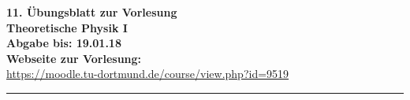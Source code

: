 \newenvironment{exercise}
[2]
{\addtocounter{exercise}{1}{\bfseries{Aufgabe \arabic{exercise}:~#1}\hfill(#2 Punkte)}\newline}
{\medskip}

\setlength{\parindent}{0mm}

{\large\bfseries 11. Übungsblatt zur Vorlesung\hfill\thesemester}\\ %
{\large\bfseries Theoretische Physik I\hfill\theprofessor}\\
{\large\bfseries Abgabe bis: 19.01.18}\\
\textbf{Webseite zur Vorlesung: \\}
\url{https://moodle.tu-dortmund.de/course/view.php?id=9519} \\
\rule{\columnwidth}{0.1ex}
\medskip
